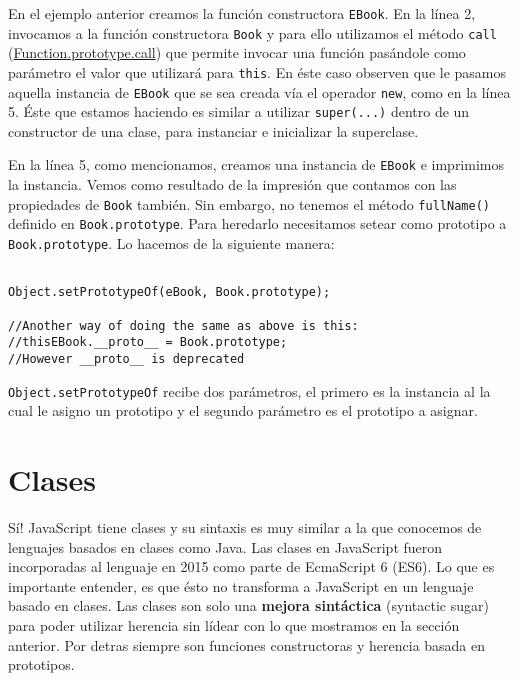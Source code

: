 \documentclass[a4paper, oneside, titlepage, 12pt]{book}
\begin{document}
En el ejemplo anterior creamos la función constructora \texttt{EBook}. En la línea 2, invocamos a la función constructora \texttt{Book} y para ello utilizamos el método \texttt{call} (\href{https://developer.mozilla.org/es/docs/Web/JavaScript/Reference/Global_Objects/Function/call}{Function.prototype.call}) que permite invocar una función pasándole como parámetro el valor que utilizará para \texttt{this}. En éste caso observen que le pasamos aquella instancia de \texttt{EBook} que se sea creada vía el operador \texttt{new}, como en la línea 5. Éste que estamos haciendo es similar a utilizar \texttt{super(...)} dentro de un constructor de una clase, para instanciar e inicializar la superclase. 
\newline

En la línea 5, como mencionamos, creamos una instancia de \texttt{EBook} e imprimimos la instancia. Vemos como resultado de la impresión que contamos con las propiedades de \texttt{Book} también. Sin embargo, no tenemos el método \texttt{fullName()} definido en \texttt{Book.prototype}. Para heredarlo necesitamos setear como prototipo a \texttt{Book.prototype}. Lo hacemos de la siguiente manera:

\begin{verbatim}

Object.setPrototypeOf(eBook, Book.prototype);

//Another way of doing the same as above is this:
//thisEBook.__proto__ = Book.prototype;
//However __proto__ is deprecated
\end{verbatim}

\texttt{Object.setPrototypeOf} recibe dos parámetros, el primero es la instancia al la cual le asigno un prototipo y el segundo parámetro es el prototipo a asignar.

\section{Clases}

Sí! JavaScript tiene clases y su sintaxis es muy similar a la que conocemos de lenguajes basados en clases como Java. Las clases en JavaScript fueron incorporadas al lenguaje en 2015 como parte de EcmaScript 6 (ES6). Lo que es importante entender, es que ésto no transforma a JavaScript en un lenguaje basado en clases. Las clases son solo una \textbf{mejora sintáctica} (syntactic sugar) para poder utilizar herencia sin lídear con lo que mostramos en la sección anterior. Por detras siempre son funciones constructoras y herencia basada en prototipos.
\newline
\end{document}
